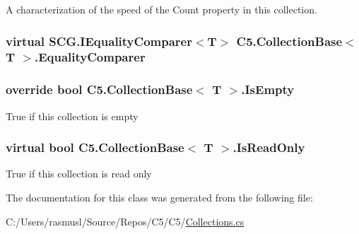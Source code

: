 A characterization of the speed of the {\ttfamily Count} property in this collection.\hypertarget{class_c5_1_1_collection_base_ab3c81e20f42c012d8ff6b5658889d108}{}
\subsubsection[{Equality\+Comparer}]{\setlength{\rightskip}{0pt plus 5cm}virtual S\+C\+G.\+I\+Equality\+Comparer$<$T$>$ {\bf C5.\+Collection\+Base}$<$ T $>$.Equality\+Comparer\hspace{0.3cm}{\ttfamily [get]}}\label{class_c5_1_1_collection_base_ab3c81e20f42c012d8ff6b5658889d108}




\hypertarget{class_c5_1_1_collection_base_a28a325cf904f11def90daf27c98007f6}{}
\subsubsection[{Is\+Empty}]{\setlength{\rightskip}{0pt plus 5cm}override bool {\bf C5.\+Collection\+Base}$<$ T $>$.Is\+Empty\hspace{0.3cm}{\ttfamily [get]}}\label{class_c5_1_1_collection_base_a28a325cf904f11def90daf27c98007f6}




True if this collection is empty\hypertarget{class_c5_1_1_collection_base_a4f9fea0df76b43f0c705fbc79a891bb9}{}
\subsubsection[{Is\+Read\+Only}]{\setlength{\rightskip}{0pt plus 5cm}virtual bool {\bf C5.\+Collection\+Base}$<$ T $>$.Is\+Read\+Only\hspace{0.3cm}{\ttfamily [get]}}\label{class_c5_1_1_collection_base_a4f9fea0df76b43f0c705fbc79a891bb9}




True if this collection is read only

The documentation for this class was generated from the following file\+:\begin{DoxyCompactItemize}
\item 
C\+:/\+Users/rasmusl/\+Source/\+Repos/\+C5/\+C5/\hyperlink{_collections_8cs}{Collections.\+cs}\end{DoxyCompactItemize}
